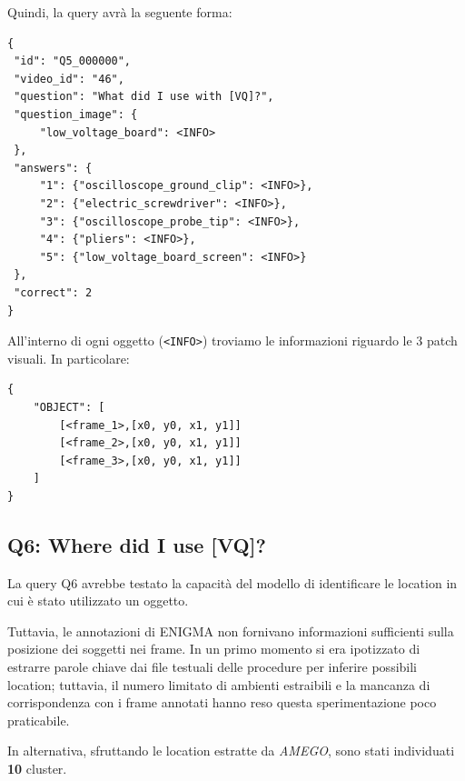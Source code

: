 Quindi, la query avrà la seguente forma:

\begin{verbatim}
{
 "id": "Q5_000000",
 "video_id": "46",
 "question": "What did I use with [VQ]?",
 "question_image": {
     "low_voltage_board": <INFO>
 },
 "answers": {
     "1": {"oscilloscope_ground_clip": <INFO>},
     "2": {"electric_screwdriver": <INFO>},
     "3": {"oscilloscope_probe_tip": <INFO>},
     "4": {"pliers": <INFO>},
     "5": {"low_voltage_board_screen": <INFO>}
 },
 "correct": 2
}
\end{verbatim}

All'interno di ogni oggetto (\texttt{<INFO>}) troviamo le informazioni riguardo le 3 patch visuali. In particolare:
\begin{verbatim}
{
    "OBJECT": [
        [<frame_1>,[x0, y0, x1, y1]]
        [<frame_2>,[x0, y0, x1, y1]]
        [<frame_3>,[x0, y0, x1, y1]]
    ]
}
\end{verbatim}


\subsection*{Q6: Where did I use [VQ]?}
La query Q6 avrebbe testato la capacità del modello di identificare le location in cui è stato utilizzato un oggetto.

Tuttavia, le annotazioni di ENIGMA non fornivano informazioni sufficienti sulla posizione dei soggetti nei frame. In un primo momento si era ipotizzato di estrarre parole chiave dai file testuali delle procedure per inferire possibili location; tuttavia, il numero limitato di ambienti estraibili e la mancanza di corrispondenza con i frame annotati hanno reso questa sperimentazione poco praticabile.  

In alternativa, sfruttando le location estratte da \emph{AMEGO}, sono stati individuati \textbf{10} cluster.


